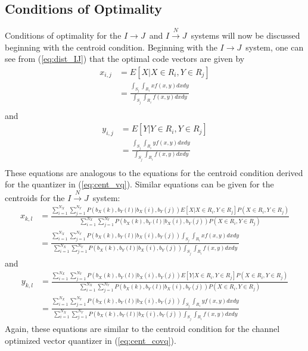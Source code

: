 \documentclass[10pt,twoside,titlepage]{article}
\newcommand{\sysIJN}{\mbox{$I \overset{N}{\rightarrow} J$}}
\newcommand{\sysIJ}{\mbox{$I \rightarrow J$}}
\begin{document}
\subsection{Conditions of Optimality}
Conditions of optimality for the \sysIJ\ and \sysIJN\ systems will now be discussed beginning with the centroid condition. Beginning with the \sysIJ\ system, one can see from (\ref{eq:dist_IJ}) that the optimal code vectors are given by
\begin{align}
x_{i,j} &= E[X | X \in R_i, Y \in R_j] \\
&= \frac{ \int_{S_j}\int_{R_i}xf(x,y)dxdy }{ \int_{S_j}\int_{R_i}f(x,y)dxdy } \\
\end{align}
and
\begin{align}
y_{i,j} &= E[Y | Y \in R_i, Y \in R_j] \\
&= \frac{ \int_{S_j}\int_{R_i}yf(x,y)dxdy }{ \int_{S_j}\int_{R_i}f(x,y)dxdy } \\
\end{align}
These equations are analogous to the equations for the centroid condition derived for the quantizer in (\ref{eq:cent_vq}). Similar equations can be given for the centroids for the \sysIJN\ system:
\begin{align}
  x_{k,l} &= \frac{\sum_{i=1}^{N_X} \sum_{j=1}^{N_Y} P(b_X(k),b_Y(l)|b_X(i),b_Y(j))E[X | X \in R_i, Y \in R_j] P(X \in R_i, Y \in R_j)}
{\sum_{i=1}^{N_X} \sum_{j=1}^{N_Y} P(b_X(k),b_Y(l)|b_X(i),b_Y(j))P(X \in R_i, Y \in R_j)}  \nonumber\\
\label{eq:cent_x}
  &= \frac{\sum_{i=1}^{N_X} \sum_{j=1}^{N_Y} P(b_X(k),b_Y(l)|b_X(i),b_Y(j))\int_{S_j} \int_{R_i} xf(x,y)dxdy}
{\sum_{i=1}^{N_X} \sum_{j=1}^{N_Y} P(b_X(k),b_Y(l)|b_X(i),b_Y(j))\int_{S_j} \int_{R_i} f(x,y)dxdy}
\end{align}
and
\begin{align}
  y_{k,l} &= \frac{\sum_{i=1}^{N_X} \sum_{j=1}^{N_Y} P(b_X(k),b_Y(l)|b_X(i),b_Y(j))E[Y | X \in R_i, Y \in R_j] P(X \in R_i, Y \in R_j)}
{\sum_{i=1}^{N_X} \sum_{j=1}^{N_Y} P(b_X(k),b_Y(l)|b_X(i),b_Y(j))P(X \in R_i, Y \in R_j)} \nonumber\\
\label{eq:cent_y}
  &= \frac{\sum_{i=1}^{N_X} \sum_{j=1}^{N_Y} P(b_X(k),b_Y(l)|b_X(i),b_Y(j))\int_{S_j} \int_{R_i} yf(x,y)dxdy}
{\sum_{i=1}^{N_X} \sum_{j=1}^{N_Y} P(b_X(k),b_Y(l)|b_X(i),b_Y(j))\int_{S_j} \int_{R_i} f(x,y)dxdy}
\end{align}
Again, these equations are similar to the centroid condition for the channel optimized vector quantizer in (\ref{eq:cent_covq}).
\end{document}
